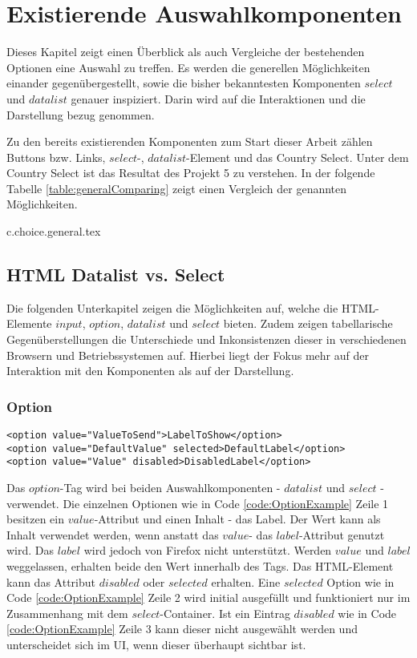 \chapter{Existierende Auswahlkomponenten}

Dieses Kapitel zeigt einen Überblick als auch Vergleiche der bestehenden Optionen eine Auswahl zu treffen. 
Es werden die generellen Möglichkeiten einander gegenübergestellt, sowie die bisher bekanntesten Komponenten $select$ und $datalist$ genauer inspiziert.
Darin wird auf die Interaktionen und die Darstellung bezug genommen. 

Zu den bereits existierenden Komponenten zum Start dieser Arbeit zählen Buttons bzw. Links, $select$-, $datalist$-Element und das Country Select.
Unter dem Country Select ist das Resultat des Projekt 5 zu verstehen.
In der folgende Tabelle \ref{table:generalComparing} zeigt einen Vergleich der genannten Möglichkeiten.

{c.choice.general.tex}

\section{HTML Datalist vs. Select}

Die folgenden Unterkapitel zeigen die Möglichkeiten auf, welche die HTML-Elemente $input$, $option$, $datalist$ und $select$ bieten.
Zudem zeigen tabellarische Gegenüberstellungen die Unterschiede und Inkonsistenzen dieser in verschiedenen Browsern und Betriebssystemen auf.
Hierbei liegt der Fokus mehr auf der Interaktion mit den Komponenten als auf der Darstellung.


\subsection{Option}

\begin{lstlisting}[style = htmlcssjs, caption = Option Example, label = code:OptionExample]
<option value="ValueToSend">LabelToShow</option>
<option value="DefaultValue" selected>DefaultLabel</option>
<option value="Value" disabled>DisabledLabel</option>
\end{lstlisting}

Das $option$-Tag wird bei beiden Auswahlkomponenten - $datalist$ und $select$ - verwendet. 
Die einzelnen Optionen wie in Code \ref{code:OptionExample} Zeile 1 besitzen ein $value$-Attribut und einen Inhalt - das Label.
Der Wert kann als Inhalt verwendet werden, wenn anstatt das $value$- das $label$-Attribut genutzt wird.
Das $label$ wird jedoch von Firefox nicht unterstützt.
Werden $value$ und $label$ weggelassen, erhalten beide den Wert innerhalb des Tags.
Das HTML-Element kann das Attribut $disabled$ oder $selected$ erhalten.
Eine $selected$ Option wie in Code \ref{code:OptionExample} Zeile 2 wird initial ausgefüllt und funktioniert nur im Zusammenhang mit dem $select$-Container. 
Ist ein Eintrag $disabled$ wie in Code \ref{code:OptionExample} Zeile 3 kann dieser nicht ausgewählt werden und unterscheidet sich im UI, wenn dieser überhaupt sichtbar ist.

